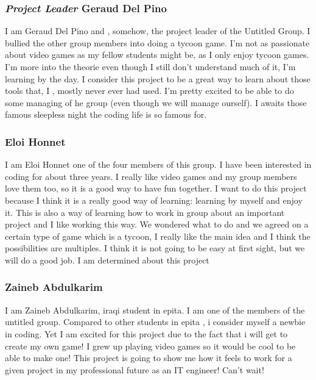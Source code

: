 \documentclass[a4paper, 11pt] {article}
\begin{document}
    \subsubsection*{\textit{Project Leader} Geraud Del Pino}

    \par
    I am Geraud Del Pino and , somehow, the project leader of the Untitled Group. I bullied the other group members into doing a tycoon game. I’m not as passionate about video games as my fellow students might be, as I only enjoy tycoon games. I’m more into the theorie even though I still don’t understand much of it, I’m learning by the day. I consider this project to be a great way to learn about those tools that, I , mostly never ever had used. I’m pretty excited to be able to do some managing of he group (even though we will manage ourself). I awaits those famous sleepless night the coding life is so famous for.
    \newline






    \subsubsection*{Eloi Honnet}

    \par
    I am Eloi Honnet one of the four members of this group. I have been interested in coding for about three years. I really like video games and my group members love them too, so it is a good way to have fun together. 
    I want to do this project because I think it is a really good way of learning: learning by myself and enjoy it. This is also a way of learning how to work in group about an important project and I like working this way.
    We wondered what to do and we agreed on a certain type of game which is a tycoon, I really like the main idea and I think the possibilities are multiples. I think it is not going to be easy at first sight, but we will do a good job. 
    I am determined about this project
    \newline




\newpage
    
    \subsubsection*{Zaineb Abdulkarim}

	\par
I am Zaineb Abdulkarim, iraqi student in epita. I am one of the members of the untitled group. Compared to other students in epita , i consider myself a newbie in coding. Yet I am excited for this project due to the fact that i will get to create my own game! I grew up playing video games so it would be cool to be able to make one! This project is going to show me how it feels to work for a given project in my professional future as an IT engineer!  Can’t wait!
	\newline
\end{document}
